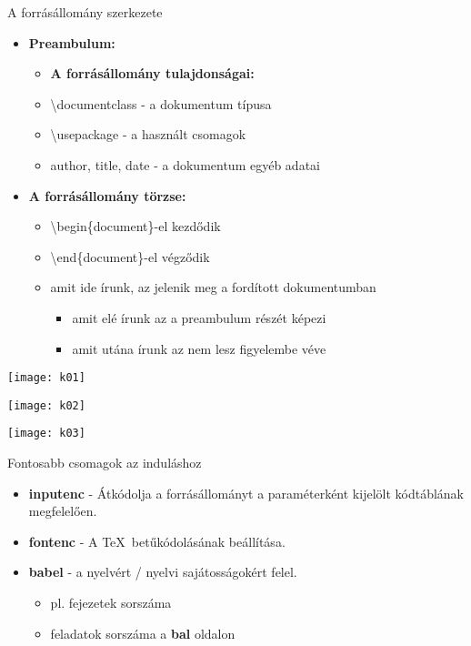 \documentclass[11pt]{beamer}
\begin{document}
\begin{frame}{A forrásállomány szerkezete}
\begin{itemize}
\item \textbf{Preambulum:}
	\begin{itemize}
	\item \textbf{A forrásállomány tulajdonságai:}
	\item \textbackslash documentclass - a dokumentum típusa
	\item \textbackslash usepackage - a használt csomagok
	\item author, title, date - a dokumentum egyéb adatai
	\end{itemize}
\item \textbf{A forrásállomány törzse:}
	\begin{itemize}
	\item \textbackslash begin\{document\}-el kezdődik
	\item \textbackslash end\{document\}-el végződik
	\item amit ide írunk, az jelenik meg a fordított dokumentumban
		\begin{itemize}
		\item amit elé írunk az a preambulum részét képezi
		\item amit utána írunk az nem lesz figyelembe véve
		\end{itemize}
	\end{itemize}
\end{itemize}
\end{frame}

\begin{frame}
\begin{center}
\texttt{[image: k01]}
\end{center}
\end{frame}

\begin{frame}
\begin{center}
\texttt{[image: k02]}
\end{center}
\end{frame}

\begin{frame}
\begin{center}
\texttt{[image: k03]}
\end{center}
\end{frame}

\begin{frame}{Fontosabb csomagok az induláshoz}
\begin{itemize}
\item \textbf{inputenc} - Átkódolja a forrásállományt a paraméterként kijelölt kódtáblának megfelelően.
\item \textbf{fontenc} - A \TeX \ betűkódolásának beállítása.
\item \textbf{babel} - a nyelvért / nyelvi sajátosságokért felel.
	\begin{itemize}
	\item pl. fejezetek sorszáma
	\item feladatok sorszáma a \textbf{bal} oldalon
	\end{itemize}
\end{itemize}
\end{frame}
\end{document}
